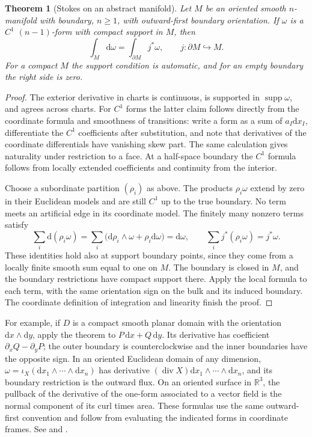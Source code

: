 \documentclass[11pt,oneside,openany]{book}
\newtheorem{theorem}{Theorem}[chapter]
\theoremstyle{definition}
\theoremstyle{remark}
\newcommand{\R}{\mathbb R}
\newcommand{\dd}{\mathrm d}
\DeclareMathOperator{\supp}{supp}
\begin{document}
\begin{theorem}[Stokes on an abstract manifold]
\label{p104:M10.04}
Let \(M\) be an oriented smooth \(n\)-manifold with boundary, \(n\geq1\),
with outward-first boundary orientation. If \(\omega\) is a \(C^1\)
\((n-1)\)-form with compact support in \(M\), then
\[
                  \int_M \dd\omega=\int_{\partial M}j^*\omega ,
                  \qquad j:\partial M\hookrightarrow M .
\]
For a compact \(M\) the support condition is automatic, and for an
empty boundary the right side is zero.
\end{theorem}
\begin{proof}
The exterior derivative in charts is continuous, is supported in
\(\supp\omega\), and agrees across charts. For \(C^1\) forms the latter
claim follows directly from the coordinate formula and smoothness of
transitions: write a form as a sum of \(a_I\dd x_I\), differentiate the
\(C^1\) coefficients after substitution, and note that derivatives of
the coordinate differentials have vanishing skew part. The same
calculation gives naturality under restriction to a face. At a
half-space boundary the \(C^1\) formula follows from locally extended
coefficients and continuity from the interior.

Choose a subordinate partition \((\rho_i)\) as above. The products
\(\rho_i\omega\) extend by zero in their Euclidean models and are still
\(C^1\) up to the true boundary. No term meets an artificial edge in
its coordinate model. The finitely many nonzero terms satisfy
\[
   \sum_i \dd(\rho_i\omega)
     =\sum_i\bigl(\dd\rho_i\wedge\omega+\rho_i \dd\omega\bigr)
     =\dd\omega ,
       \qquad
   \sum_i j^*(\rho_i\omega)=j^*\omega .
\]
These identities hold also at support boundary points, since they
come from a locally finite smooth sum equal to one on \(M\).
The boundary is closed in \(M\), and the boundary restrictions have
compact support there. Apply the local formula to each term, with the
same orientation sign on the bulk and its induced boundary. The
coordinate definition of integration and linearity finish the proof.
\end{proof}

For example, if \(D\) is a compact smooth planar domain with the
orientation \(\dd x\wedge\dd y\), apply the theorem to
\(P\,\dd x+Q\,\dd y\). Its derivative has coefficient
\(\partial_xQ-\partial_yP\); the outer boundary is counterclockwise and
the inner boundaries have the opposite sign. In an oriented Euclidean
domain of any dimension, \(\omega=\iota_X(\dd x_1\wedge\cdots\wedge\dd
x_n)\) has derivative \((\operatorname{div}X)\dd x_1\wedge\cdots\wedge\dd
x_n\), and its boundary restriction is the outward flux. On an oriented
surface in \(\R^3\), the pullback of the derivative of the one-form
associated to a vector field is the normal component of its curl times
area. These formulas use the same outward-first convention and follow
from evaluating the indicated forms in coordinate frames. See
\cite[Theorem 16.11 and pp.~411--415, 421--425]{lee} and
\cite[\S23.5]{tu}.
\end{document}
